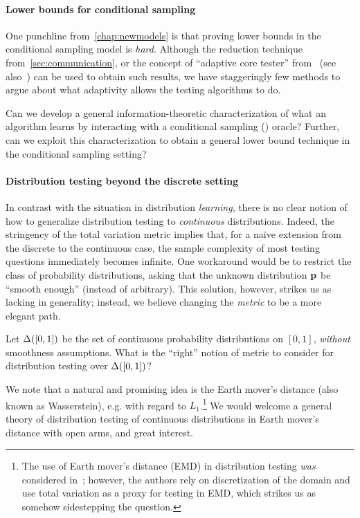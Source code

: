 \paragraph*{Lower bounds for conditional sampling} One punchline from~\cref{chap:newmodels} is that proving lower bounds in the conditional sampling model is \emph{hard}. Although the reduction technique from~\cref{sec:communication}, or the concept of ``adaptive core tester'' from~\cite{CFGM:13} (see also~\cite{ACK:14}) can be used to obtain such results, we have staggeringly few methods to argue about what adaptivity allows the testing algorithms to do.
\begin{question}
   Can we develop a general information-theoretic characterization of what an algorithm learns by interacting with a conditional sampling (\COND) oracle? Further, can we exploit this characterization to obtain a general lower bound technique in the conditional sampling setting?
\end{question}

\paragraph*{Distribution testing beyond the discrete setting} In contrast with the situation in distribution \emph{learning}, there is no clear notion of how to generalize distribution testing to \emph{continuous} distributions. Indeed, the stringency of the total variation metric implies that, for a na\"ive extension from the discrete to the continuous case, the sample complexity of most testing questions immediately becomes infinite. One workaround would be to restrict the class of probability distributions, asking that the unknown distribution $\mathbf{p}$ be ``smooth enough'' (instead of arbitrary). This solution, however, strikes us as lacking in generality; instead, we believe changing the \emph{metric} to be a more elegant path.
\begin{question}
   Let $\Delta\!\left([0,1]\right)$ be the set of continuous probability distributions on $[0,1]$, \emph{without} smoothness assumptions. What is the ``right'' notion of metric to consider for distribution testing over $\Delta\!\left([0,1]\right)$?
\end{question}
\noindent We note that a natural and promising idea is the Earth mover's distance (also known as Wasserstein), e.g. with regard to $L_1$.\footnote{The use of Earth mover's distance (EMD) in distribution testing \emph{was} considered in~\cite{BANNR:11}; however, the authors rely on discretization of the domain and use total variation as a proxy for testing in EMD, which strikes us as somehow sidestepping the question.}{} We would welcome a general theory of distribution testing of continuous distributions in Earth mover's distance with open arms, and great interest.
